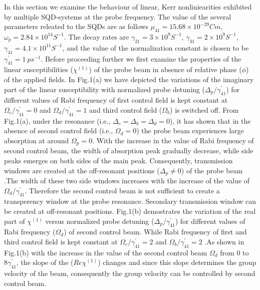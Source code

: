 \documentclass[a4paper,12pt]{article}
\begin{document}
In this section we examine the behaviour of linear, Kerr nonliniearities exhibited by multiple SQD-systems at the probe frequency. The value of the several parameters releated to the SQDs are as follows \(\mu_{41} = 15.68\times10^{-29} Cm\), \(\omega_p = 2.84\times10^{14} S^{-1}\). The decay rates are \(\gamma_{21}=3\times10^9S^{-1}\), \( \gamma_{31}=2\times10^9S^{-1} \), \( \gamma_{41}=4.1\times10^{11}S^{-1} \), and the value of the normalization constant is chosen to be \( \gamma^{\prime}_{41}=1\ ps^{-1} \). Before proceeding further we first examine the properties of the linear susceptibilities (\(\chi^{(1)}\)) of the probe beam in absence of relative phase ($\phi$) of the applied fields. In Fig.1(a) we have depicted the variations of the imaginary part of the linear susceptibility with normalized probe detuning ($\Delta_p/\gamma^{\prime}_{41}$) for different values of Rabi frequency of first control field is kept constant at $\Omega_c/\gamma^{\prime}_{41}=0$ and $\Omega_d/\gamma^{\prime}_{41}=1$ and third control field ($\Omega_b$) is switched off. From Fig.1(a), under the resonance (i.e., $\Delta_c = \Delta_b = \Delta_d = 0$), it has shown that in the absence of second control field (i.e., $\Omega_d = 0$) the probe beam experiences large absorption at around $\Omega_p=0$. With the increase in the value of Rabi frequency of second control beam, the width of absorption peak gradually decrease, while side peaks emerges on both sides of the main peak. Consequently, transmission windows are created at the off-resonant positions ($\Delta_p \neq 0$) of the probe beam .The width of these two side windows increases with the increase of the value of $\Omega_d/\gamma^{\prime}_{41}$. Therefore the second control beam is not sufficient to create a transperency window at the probe resonance. Secondary transmission window can be created at off-resonant positions. Fig.1(b) demostrates the variation of the real part of $\chi^{(1)}$ versus normalized probe detuning ($\Delta_p/\gamma^{\prime}_{41}$) for different values of Rabi frequency ($\Omega_{d}$) of second control beam. While Rabi frequency of first and third control field is kept constant at $\Omega_{c}/\gamma^{\prime}_{41}=2$ and $\Omega_{b}/\gamma^{\prime}_{41}=2$ .As shown in Fig.1(b) with the increase in the value of the second control beam $\Omega_{d}$ from $0$ to $8\gamma^{\prime}_{41}$, the slope of the ($Re\chi^{(1)}$) changes and since this slope determines the group velocity of the beam, consequently the group velocity can be controlled by second control beam. \par
\end{document}
